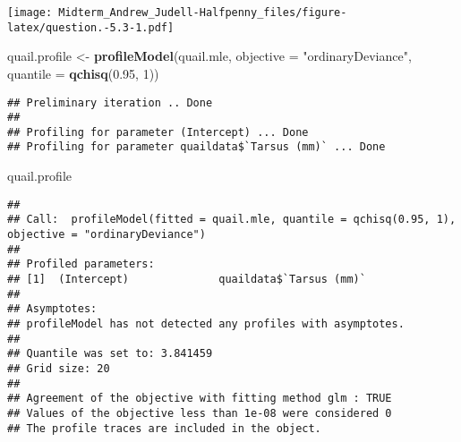 \documentclass[]{article}
\newenvironment{Shaded}{\begin{snugshade}}{\end{snugshade}}
\newcommand{\KeywordTok}[1]{\textcolor[rgb]{0.13,0.29,0.53}{\textbf{#1}}}
\newcommand{\DataTypeTok}[1]{\textcolor[rgb]{0.13,0.29,0.53}{#1}}
\newcommand{\DecValTok}[1]{\textcolor[rgb]{0.00,0.00,0.81}{#1}}
\newcommand{\FloatTok}[1]{\textcolor[rgb]{0.00,0.00,0.81}{#1}}
\newcommand{\StringTok}[1]{\textcolor[rgb]{0.31,0.60,0.02}{#1}}
\newcommand{\OperatorTok}[1]{\textcolor[rgb]{0.81,0.36,0.00}{\textbf{#1}}}
\newcommand{\NormalTok}[1]{#1}
\begin{document}
\begin{Shaded}
\end{Shaded}

\texttt{[image: Midterm\_Andrew\_Judell-Halfpenny\_files/figure-latex/question.-5.3-1.pdf]}

\begin{Shaded}
\begin{Highlighting}[]
\NormalTok{quail.profile <-}\StringTok{ }\KeywordTok{profileModel}\NormalTok{(quail.mle,}
                     \DataTypeTok{objective =} \StringTok{"ordinaryDeviance"}\NormalTok{,}
                     \DataTypeTok{quantile =} \KeywordTok{qchisq}\NormalTok{(}\FloatTok{0.95}\NormalTok{, }\DecValTok{1}\NormalTok{))}
\end{Highlighting}
\end{Shaded}

\begin{verbatim}
## Preliminary iteration .. Done
## 
## Profiling for parameter (Intercept) ... Done
## Profiling for parameter quaildata$`Tarsus (mm)` ... Done
\end{verbatim}

\begin{Shaded}
\begin{Highlighting}[]
\NormalTok{quail.profile}
\end{Highlighting}
\end{Shaded}

\begin{verbatim}
## 
## Call:  profileModel(fitted = quail.mle, quantile = qchisq(0.95, 1),      objective = "ordinaryDeviance") 
## 
## Profiled parameters:
## [1]  (Intercept)              quaildata$`Tarsus (mm)`
## 
## Asymptotes:
## profileModel has not detected any profiles with asymptotes.
## 
## Quantile was set to: 3.841459 
## Grid size: 20 
## 
## Agreement of the objective with fitting method glm : TRUE 
## Values of the objective less than 1e-08 were considered 0 
## The profile traces are included in the object.
\end{verbatim}
\end{document}
